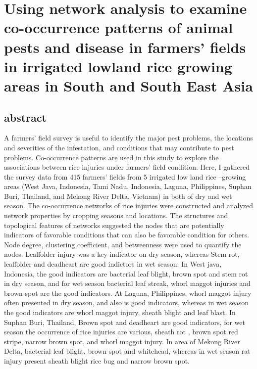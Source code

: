 \section{Using network analysis to examine co-occurrence patterns of animal pests and disease in farmers' fields in irrigated lowland rice growing areas in South and South East Asia}


\subsection{abstract}
A farmers’ field survey is useful to identify the major pest problems, the locations and severities of the infestation, and conditions that may contribute to pest problems. Co-occurrence patterns are used in this study to explore the associations between rice injuries under farmers’ field condition. Here, I gathered the survey data from 415 farmers’ fields from 5 irrigated low land rice –growing areas (West Java, Indonesia, Tami Nadu, Indonesia, Laguna, Philippines, Suphan Buri, Thailand, and Mekong River Delta, Vietnam) in both of dry and wet season. The co-occurrence networks of rice injuries were constructed and analyzed network properties by cropping seasons and locations. The structures and topological features of networks suggested the nodes that are potentially indicators of favorable conditions that can also be favorable condition for others. Node degree, clustering coefficient, and betweenness were used to quantify the nodes. Leaffolder injury was a key indicator on dry season, whereas Stem rot, leaffolder and deadheart are good indictors in wet season. In West java, Indonesia, the good indicators are bacterial leaf blight, brown spot and stem rot in dry season, and for wet season bacterial leaf streak, whorl maggot injuries and brown spot are the good indicators. At Laguna, Philippines, whorl maggot injury often presented in dry season, and also is good indicators, whereas in wet season the good indicators are whorl maggot injury, sheath blight and leaf blast. In Suphan Buri, Thailand, Brown spot and deadheart are good indicators, for wet season the occurrence of rice injuries are various, sheath rot , brown spot red stripe, narrow brown spot, and whorl maggot injury. In area of Mekong River Delta, bacterial leaf blight, brown spot and whitehead, whereas in wet season rat injury present sheath blight rice bug and narrow brown spot.

